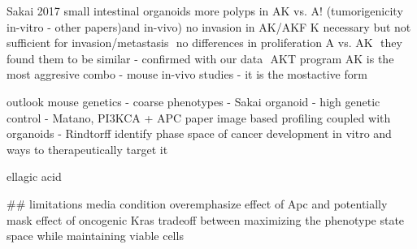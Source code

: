 Sakai 2017
small intestinal organoids more polyps in AK vs. A! (tumorigenicity in-vitro - other papers)and in-vivo) no invasion in AK/AKF K necessary but not sufficient for invasion/metastasis  no differences in proliferation A vs. AK  they found them to be similar - confirmed with our data  AKT program AK is the most aggresive combo - mouse in-vivo studies - it is the mostactive form

outlook 
mouse genetics - coarse phenotypes  - Sakai
organoid - high genetic control - Matano, PI3KCA + APC paper
image based profiling coupled with organoids - Rindtorff
identify phase space of cancer development in vitro and ways to therapeutically target it

ellagic acid

## limitations
media condition overemphasize effect of Apc and potentially mask effect of oncogenic Kras
tradeoff between maximizing the phenotype state space while maintaining viable cells 